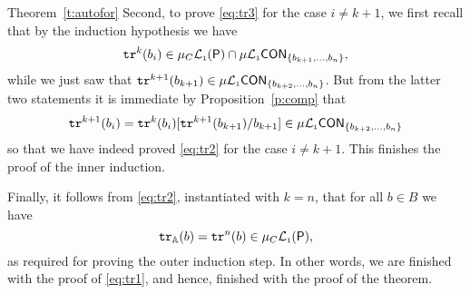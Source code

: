 \begin{proofof}{Theorem~\ref{t:autofor}}
Second, to prove \eqref{eq:tr3} for the case $i \neq k+1$, we first 
recall that by the induction hypothesis we have
\[
\mathtt{tr}^{k}(b_{i}) \in \mu_{C}\mathcal{L}_{\scriptscriptstyle 1}(\mathsf{P}) \cap 
    \mu\mathcal{L}_{\scriptscriptstyle 1}\mathsf{CON}_{\{ b_{k+1},\ldots,b_{n}\}},
\]
while we just saw that 
$\mathtt{tr}^{k+1}(b_{k+1}) \in \mu\mathcal{L}_{\scriptscriptstyle 1}\mathsf{CON}_{\{ b_{k+2},\ldots,b_{n}\}}$.
But from the latter two statements it is immediate by Proposition~\ref{p:comp} 
that 
\[
\mathtt{tr}^{k+1}(b_{i}) = \mathtt{tr}^{k}(b_{i})[\mathtt{tr}^{k+1}(b_{k+1})/b_{k+1}] 
\in \mu\mathcal{L}_{\scriptscriptstyle 1}\mathsf{CON}_{\{ b_{k+2},\ldots,b_{n}\}}
\]
so that we have indeed proved \eqref{eq:tr2} for the case $i \neq 
k+1$.
This finishes the proof of the inner induction.

Finally, it follows from \eqref{eq:tr2}, instantiated with $k = n$, 
that for all $b \in B$ we have
\[
\mathtt{tr}_{\mathbb{A}}(b) = \mathtt{tr}^{n}(b) \in \mu_{C}\mathcal{L}_{\scriptscriptstyle 1}(\mathsf{P}),
\]
as required for proving the outer induction step.
In other words, we are finished with the proof of \eqref{eq:tr1}, and 
hence, finished with the proof of the theorem.
\end{proofof}


